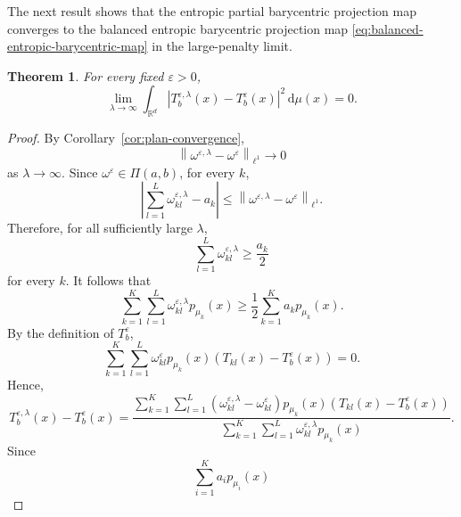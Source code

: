 \documentclass[a4paper,11pt]{article}
\numberwithin{equation}{section}
\newtheorem{thm}{Theorem}[section]
\newcommand{\eps}{\varepsilon}
\newcommand{\RR}{\mathbb{R}}
\newcommand{\dd}{\,\mathrm{d}}
\begin{document}
The next result shows that the entropic partial barycentric projection map converges to the balanced entropic barycentric projection map \eqref{eq:balanced-entropic-barycentric-map} in the large-penalty limit.

\begin{thm}\label{thm:epot-barycentric-convergence}
For every fixed $\eps>0$,
\begin{equation}\label{eq:epot-barycentric-L2-convergence}
  \lim_{\lambda\to\infty}\int_{\RR^d}\left|T_b^{\eps,\lambda}(x)-T_b^\eps(x)\right|^2\dd\mu(x)=0.
\end{equation}
\end{thm}

\begin{proof}
By Corollary~\ref{cor:plan-convergence},
\begin{equation}\label{eq:barycentric-coupling-convergence}
  \left\|
  \omega^{\eps,\lambda}-\omega^\eps
  \right\|_{\ell^1}
  \to0
\end{equation}
as $\lambda\to\infty$. Since $\omega^\eps\in\Pi(a,b)$, for every $k$,
\begin{equation*}
  \left| \sum_{l=1}^{L}\omega^{\eps,\lambda}_{kl}-a_k \right| \leq \left\| \omega^{\eps,\lambda}-\omega^\eps \right\|_{\ell^1}.
\end{equation*}
Therefore, for all sufficiently large $\lambda$,
\begin{equation*}
  \sum_{l=1}^{L}\omega^{\eps,\lambda}_{kl}
  \geq
  \frac{a_k}{2}
\end{equation*}
for every $k$. It follows that
\begin{equation}\label{eq:partial-barycentric-denominator-bound}
  \sum_{k=1}^{K}\sum_{l=1}^{L}
  \omega^{\eps,\lambda}_{kl}p_{\mu_k}(x) \geq \frac{1}{2} \sum_{k=1}^{K}a_kp_{\mu_k}(x).
\end{equation}
By the definition of $T_b^\eps$,
\begin{equation*}
  \sum_{k=1}^{K}\sum_{l=1}^{L}\omega^\eps_{kl}p_{\mu_k}(x)\left(T_{kl}(x)-T_b^\eps(x)\right)=0.
\end{equation*}
Hence,
\begin{equation*}
  T_b^{\eps,\lambda}(x)-T_b^\eps(x)=\frac{\displaystyle\sum_{k=1}^{K}\sum_{l=1}^{L}\left(\omega^{\eps,\lambda}_{kl}-\omega^\eps_{kl}\right)p_{\mu_k}(x)\left(T_{kl}(x)-T_b^\eps(x)\right)}{\displaystyle\sum_{k=1}^{K}\sum_{l=1}^{L}\omega^{\eps,\lambda}_{kl}p_{\mu_k}(x)}.
\end{equation*}
Since
\begin{equation*}
  \sum_{i=1}^{K}a_ip_{\mu_i}(x)

\end{equation*}
\end{proof}
\end{document}
